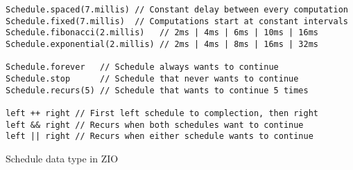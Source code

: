 \begin{algorithm}

\begin{verbatim}
Schedule.spaced(7.millis) // Constant delay between every computation
Schedule.fixed(7.millis)  // Computations start at constant intervals
Schedule.fibonacci(2.millis)   // 2ms | 4ms | 6ms | 10ms | 16ms
Schedule.exponential(2.millis) // 2ms | 4ms | 8ms | 16ms | 32ms

Schedule.forever   // Schedule always wants to continue
Schedule.stop      // Schedule that never wants to continue
Schedule.recurs(5) // Schedule that wants to continue 5 times

left ++ right // First left schedule to complection, then right
left && right // Recurs when both schedules want to continue
left || right // Recurs when either schedule wants to continue
\end{verbatim}

\caption{Schedule data type in ZIO \label{zio:schedule}}
\end{algorithm}
